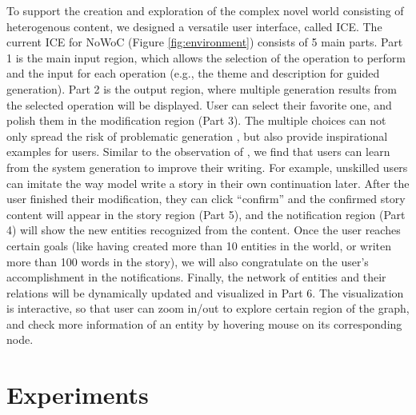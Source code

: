 \documentclass{article}
\newcommand{\KZ}[1]{\textcolor{blue}{Kenny: #1}}
\begin{document}
To support the creation and exploration of the complex novel world consisting of heterogenous content, we designed a versatile user interface, called ICE. 
The current ICE for NoWoC (Figure \ref{fig:environment}) consists of 5 main parts. 
Part 1 is the main input region, which allows the selection of the operation to 
perform and the input for each operation (e.g., the theme and description for 
guided generation). Part 2 is the output region, where multiple generation results 
from the selected operation will be displayed. User can select their favorite one, 
and polish them in the modification region (Part 3). The multiple choices 
can not only spread the risk of problematic generation \cite{zhang2021diverse}, 
but also provide inspirational examples for users. Similar to the observation 
of \cite{roemmele2021inspiration}, we find that users can learn from the system 
generation to improve their writing. For example, unskilled users can imitate the way model write a story in their own continuation later. %
After the user finished their modification, they can click ``confirm'' and the 
confirmed story content will appear in the story region (Part 5), 
and the notification region (Part 4) will show the new entities recognized from 
the content. Once the user reaches certain goals (like having created more than 
10 entities in the world, or writen more than 100 words in the story), 
we will also congratulate on the user's accomplishment in the notifications. 
Finally, the network of entities and their relations will be dynamically updated and 
visualized in Part 6. The visualization is interactive, so that user can 
zoom in/out to explore certain region of the graph, and check more information of 
an entity by hovering mouse on its corresponding node.

\section{Experiments}
\end{document}
